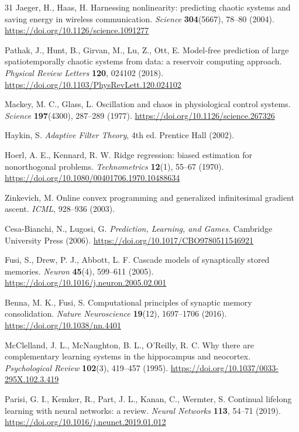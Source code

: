 \documentclass[preprint,12pt]{elsarticle}
\begin{document}
\begin{thebibliography}{31}
 Jaeger, H., Haas, H. Harnessing nonlinearity:
predicting chaotic systems and saving energy in wireless communication.
\emph{Science} \textbf{304}(5667), 78--80 (2004).
\url{https://doi.org/10.1126/science.1091277}

 Pathak, J., Hunt, B., Girvan, M., Lu, Z., Ott, E.
Model-free prediction of large spatiotemporally chaotic systems from data:
a reservoir computing approach. \emph{Physical Review Letters}
\textbf{120}, 024102 (2018). \url{https://doi.org/10.1103/PhysRevLett.120.024102}

 Mackey, M. C., Glass, L. Oscillation and chaos
in physiological control systems. \emph{Science} \textbf{197}(4300),
287--289 (1977). \url{https://doi.org/10.1126/science.267326}

 Haykin, S. \emph{Adaptive Filter Theory}, 4th ed.
Prentice Hall (2002).

 Hoerl, A. E., Kennard, R. W. Ridge regression: biased
estimation for nonorthogonal problems. \emph{Technometrics} \textbf{12}(1),
55--67 (1970). \url{https://doi.org/10.1080/00401706.1970.10488634}

 Zinkevich, M. Online convex programming and
generalized infinitesimal gradient ascent. \emph{ICML}, 928--936 (2003).

 Cesa-Bianchi, N., Lugosi, G. \emph{Prediction,
Learning, and Games}. Cambridge University Press (2006).
\url{https://doi.org/10.1017/CBO9780511546921}

 Fusi, S., Drew, P. J., Abbott, L. F. Cascade models of
synaptically stored memories. \emph{Neuron} \textbf{45}(4), 599--611
(2005). \url{https://doi.org/10.1016/j.neuron.2005.02.001}

 Benna, M. K., Fusi, S. Computational principles of
synaptic memory consolidation. \emph{Nature Neuroscience} \textbf{19}(12),
1697--1706 (2016). \url{https://doi.org/10.1038/nn.4401}

 McClelland, J. L., McNaughton, B. L., O'Reilly,
R. C. Why there are complementary learning systems in the hippocampus and
neocortex. \emph{Psychological Review} \textbf{102}(3), 419--457 (1995).
\url{https://doi.org/10.1037/0033-295X.102.3.419}

 Parisi, G. I., Kemker, R., Part, J. L., Kanan, C.,
Wermter, S. Continual lifelong learning with neural networks: a review.
\emph{Neural Networks} \textbf{113}, 54--71 (2019).
\url{https://doi.org/10.1016/j.neunet.2019.01.012}


\end{thebibliography}
\end{document}
